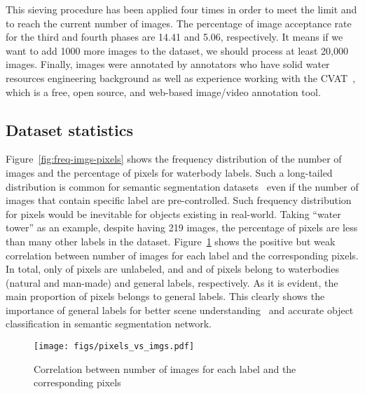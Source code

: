 \documentclass{article}
\begin{document}
This sieving procedure has been applied four times in order to meet the limit and to reach the current number of images. The percentage of image acceptance rate for the third and fourth phases are 14.41 and 5.06, respectively. It means if we want to add 1000 more images to the dataset, we should process at least 20,000 images. Finally, images were annotated by annotators who have solid water resources engineering background as well as experience working with the CVAT~\cite{boris_sekachev_2020_4009388}, which is a free, open source, and web-based image/video annotation tool.

\subsection{Dataset statistics} \label{subsec:dataset-statistics}
Figure~\ref{fig:freq-imgs-pixels} shows the frequency distribution of the number of images and the percentage of pixels for waterbody labels. Such a long-tailed distribution is common for semantic segmentation datasets~\cite{lin2014microsoft, zhou2019semantic} even if the number of images that contain specific label are pre-controlled. Such frequency distribution for pixels would be inevitable for objects existing in real-world. Taking ``water tower'' as an example, despite having 219 images, the percentage of pixels are less than many other labels in the dataset. Figure~\ref{fig:freq-vs-pixels} shows the positive but weak correlation between number of images for each label and the corresponding pixels. In total, only  of pixels are unlabeled, and  and  of pixels belong to waterbodies (natural and man-made) and general labels, respectively. As it is evident, the main proportion of pixels belongs to general labels. This clearly shows the importance of general labels for better scene understanding~\cite{caesar2018coco} and accurate object classification in semantic segmentation network.

\begin{figure}[htbp]
    \centering
    \texttt{[image: figs/pixels\_vs\_imgs.pdf]}
    \caption{Correlation between number of images for each label and the corresponding pixels}
    \label{fig:freq-vs-pixels}
\end{figure}
\end{document}
